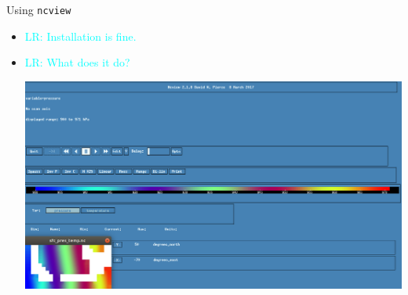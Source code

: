 \documentclass[compress,11pt,xcolor=svgnames,aspectratio=169]{beamer}
\newcommand{\lr}[1]{\textcolor{cyan}{LR: #1}}
\begin{document}
\begin{frame}[fragile]{Using \texttt{ncview}}

\begin{itemize}

  \item \lr{Installation is fine.}
  \item \lr{What does it do?}

  \begin{center}
  \includegraphics[scale=0.3]{fig/ncview}
  \end{center}

\end{itemize}

\end{frame}
\end{document}
